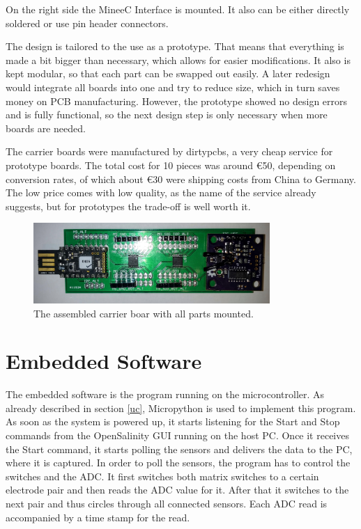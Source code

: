 On the right side the MineeC Interface is mounted. It also can be either directly soldered or use pin header connectors.

The design is tailored to the use as a prototype. That means that everything is made a bit bigger than necessary, which allows for easier modifications. It also is kept modular, so that each part can be swapped out easily. A later redesign would integrate all boards into one and try to reduce size, which in turn saves money on PCB manufacturing. However, the prototype showed no design errors and is fully functional, so the next design step is only necessary when more boards are needed.

The carrier boards were manufactured by dirtypcbs, a very cheap service for prototype boards. The total cost for 10 pieces was around \euro{50}, depending on conversion rates, of which about \euro{30} were shipping costs from China to Germany. The low price comes with low quality, as the name of the service already suggests, but for prototypes the trade-off is well worth it.

\begin{figure}
	\begin{center}
		\includegraphics[width=0.8\textwidth]{images/cb.jpg} 
		\caption{The assembled carrier boar with all parts mounted.}
		\label{fig:cb}
	\end{center}
\end{figure}

\section{Embedded Software}

The embedded software is the program running on the microcontroller. As already described in section \ref{uc}, Micropython is used to implement this program.\\

As soon as the system is powered up, it starts listening for the Start and Stop commands from the OpenSalinity GUI running on the host PC. Once it receives the Start command, it starts polling the sensors and delivers the data to the PC, where it is captured.
In order to poll the sensors, the program has to control the switches and the ADC. It first switches both matrix switches to a certain electrode pair and then reads the ADC value for it. After that it switches to the next pair and thus circles through all connected sensors. Each ADC read is accompanied by a time stamp for the read.\\

